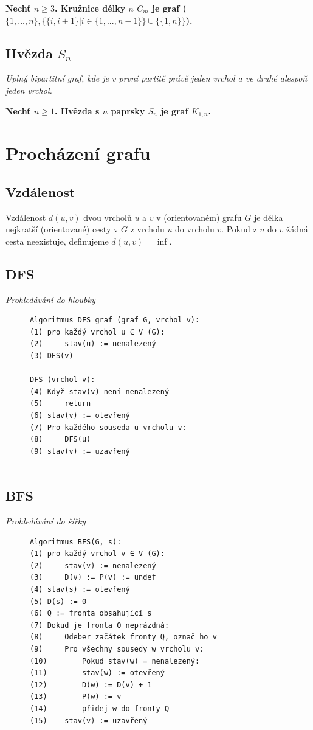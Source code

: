\documentclass{szzclass}
\begin{document}
\textbf{Nechť $n \geq 3$.\newline
Kružnice délky $n$ $C_m$ je graf\newline
($\{1, . . . , n\}, \{\{i, i + 1\} | i \in \{1, . . . ,n-1\}\} \cup \{\{1, n\}\}$).
}

\subsection{Hvězda $S_n$}
\textit{Uplný bipartitní graf, kde je v první partitě právě jeden vrchol a ve druhé alespoň jeden vrchol.}

\textbf{Nechť $n \geq 1$.\newline
Hvězda s $n$ paprsky $S_n$ je graf $K_{1,n}$.
}


\section{Procházení grafu}

\subsection{Vzdálenost}
Vzdálenost $d(u, v)$ dvou vrcholů $u$ a $v$ v (orientovaném) grafu $G$ je
délka nejkratší (orientované) cesty v $G$ z vrcholu $u$ do vrcholu $v$.
Pokud z $u$ do $v$ žádná cesta neexistuje, definujeme $d(u, v) = \inf$.


\subsection{DFS}
\textit{Prohledávání do hloubky}

\begin{figure}[h!]
\begin{verbatim}
Algoritmus DFS_graf (graf G, vrchol v):
(1) pro každý vrchol u ∈ V (G):
(2)     stav(u) := nenalezený
(3) DFS(v)

DFS (vrchol v):
(4) Když stav(v) není nenalezený
(5)     return
(6) stav(v) := otevřený
(7) Pro každého souseda u vrcholu v:
(8)     DFS(u)
(9) stav(v) := uzavřený
    
\end{verbatim}
\end{figure}


\subsection{BFS}
\textit{Prohledávání do šířky}

\begin{figure}[h!]
\begin{verbatim}
Algoritmus BFS(G, s):
(1) pro každý vrchol v ∈ V (G):
(2)     stav(v) := nenalezený
(3)     D(v) := P(v) := undef
(4) stav(s) := otevřený
(5) D(s) := 0
(6) Q := fronta obsahující s
(7) Dokud je fronta Q neprázdná:
(8)     Odeber začátek fronty Q, označ ho v
(9)     Pro všechny sousedy w vrcholu v:
(10)        Pokud stav(w) = nenalezený:
(11)        stav(w) := otevřený
(12)        D(w) := D(v) + 1
(13)        P(w) := v
(14)        přidej w do fronty Q
(15)    stav(v) := uzavřený
\end{verbatim}    
\end{figure}
\end{document}
